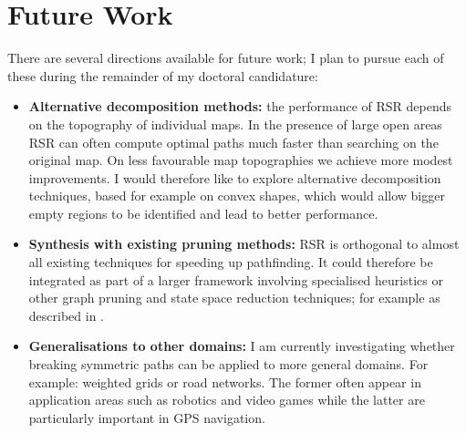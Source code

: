 \section{Future Work}
\label{sec:futurework}
There are several directions available for future work; I plan to pursue each
of these during the remainder of my doctoral candidature:
\begin{itemize}
\item{\textbf{Alternative decomposition methods:} the performance of RSR depends on the 
topography of individual maps. In the presence of large open 
areas RSR can often compute optimal paths much faster than searching on the original
map. On less favourable map topographies we achieve more modest improvements.
I would therefore like to explore alternative decomposition techniques, based
for example on convex shapes, which would allow bigger empty regions to be
identified and lead to better performance.}
\item{\textbf{Synthesis with existing pruning methods:} RSR is orthogonal to almost
all existing techniques for speeding up pathfinding. It could therefore be
integrated as part of a larger framework involving specialised heuristics or
other graph pruning and state space reduction techniques; for example as
described in \cite{botea04,bjornsson06,pochter10}.}
\item{\textbf{Generalisations to other domains:} I am currently investigating
whether breaking symmetric paths can be applied to more general domains. For
example: weighted grids or road networks. The former often appear in application
areas such as robotics and video games while the latter are particularly
important in GPS navigation.
}
\end{itemize}
